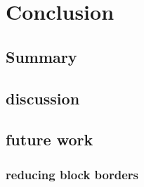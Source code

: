 \chapter{Conclusion}
\section{Summary} %

\section{discussion}
\section{future work}
\subsection{reducing block borders}

